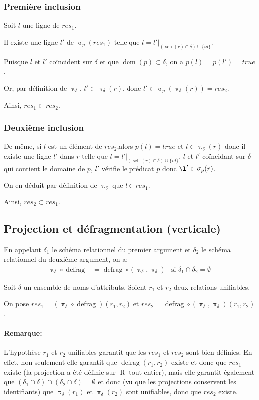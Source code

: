 \documentclass[french]{article}
\DeclareMathOperator{\proj}{\pi}
\DeclareMathOperator{\sel}{\sigma}
\DeclareMathOperator{\defrag}{defrag}
\DeclareMathOperator{\dom}{dom}
\DeclareMathOperator{\R}{R}
\DeclareMathOperator{\s}{sch}
\newcommand{\projDelta}{\proj_{\delta}}
\newcommand{\selP}{\sel_p}
\newcommand{\cip}{\cup \{id\}}
\newcommand{\dintro}{De même, si $l$ est un élément de $res_2$,}
\begin{document}
\subsubsection*{Première inclusion}
Soit $l$ une ligne de $res_1$.

Il existe une ligne $l'$ de $\selP(res_1)$
telle que $l = l'|_{(\s(r)\cap \delta) \cip}$.

Puisque $l$ et $l'$ coïncident sur $\delta$
et que $\dom(p) \subset \delta$,
on a $p(l) = p(l') = true$.

Or, par définition de $\projDelta$, $l' \in \projDelta(r)$,
donc $l' \in \selP(\projDelta(r)) = res_2$.

Ainsi,
$res_1 \subset res_2$.

\subsubsection*{Deuxième inclusion}
\dintro alors $p(l) = true$ et $l \in \projDelta(r)$
donc il existe une ligne $l'$ dans $r$ telle que 
$l = l'|_{(\s(r)\cap \delta) \cip}$.
$l$ et $l'$ coïncidant sur $\delta$ qui contient
le domaine de $p$, $l'$ vérifie le prédicat $p$
donc $\l' \in \selP(r)$.

On en déduit par définition de $\projDelta$ que
$l \in res_1$.

Ainsi, $res_2 \subset res_1$.

\subsection*{Projection et défragmentation (verticale)}
En appelant $\delta_1$ le schéma relationnel du premier
argument et $\delta_2$ le schéma relationnel du deuxième
argument, on a:
\begin{align}
\projDelta \circ \defrag
& = \defrag \circ (\projDelta, \projDelta)
& \text{si $\delta_1 \cap \delta_2 = \emptyset$}
\end{align}

Soit $\delta$ un ensemble de noms d'attributs.
Soient $r_1$ et $r_2$ deux relations unifiables.

On pose ${res}_1 = (\projDelta \circ \defrag) (r_1, r_2)$
et ${res}_2 = \defrag \circ (\projDelta, \proj_\delta) (r_1, r_2)$.

\paragraph*{Remarque:}
L'hypothèse \og $r_1$ et $r_2$ unifiables \fg{} garantit que
les ${res}_1$ et ${res}_2$ sont bien définies.
En effet, non seulement elle garantit que $\defrag(r_1, r_2)$ existe et donc
que $res_1$ existe (la projection a été définie sur $\R$ tout entier),
mais elle garantit également que $(\delta_1 \cap \delta) \cap (\delta_2 \cap \delta) = \emptyset$
et donc (vu que les projections conservent les identifiants) que
$\projDelta(r_1)$ et $\projDelta(r_2)$ sont unifiables, donc que $res_2$ existe.
\end{document}
